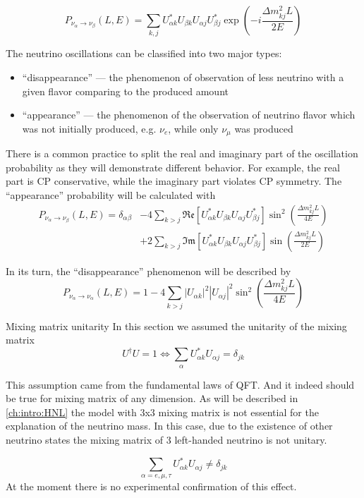 \documentclass[../main.tex]{subfiles}
\begin{document}
\begin{equation}
P_{\nu_\alpha\to\nu_\beta}(L, E)=\sum_{k, j}U^*_{\alpha k}U_{\beta k}U_{\alpha j}U^*_{\beta j}\exp\left(-i\frac{\Delta m^2_{kj}L}{2E}\right)
\end{equation}

The neutrino oscillations can be classified into two major types:
\begin{itemize}
  \item ``disappearance'' --- the phenomenon of observation of less neutrino with a given flavor comparing to the produced amount
  \item ``appearance'' --- the phenomenon of the observation of neutrino flavor which was not initially produced, e.g. $\nu_e$, while  only $\nu_\mu$ was produced
\end{itemize}
There is a common practice to split the real and imaginary part of the oscillation probability as they will demonstrate different behavior. For example, the real part is CP conservative, while the imaginary part violates CP symmetry. The ``appearance'' probability will be calculated with
\begin{align}
\nonumber
P_{\nu_\alpha\to\nu_\beta}(L, E)=\delta_{\alpha\beta}&-4\sum_{k>j}\mathfrak{Re}\left[U^*_{\alpha k}U_{\beta k}U_{\alpha j}U^*_{\beta j}\right]\sin^2\left(\frac{\Delta m^2_{kj}L}{4E}\right) \\
&+2\sum_{k>j}\mathfrak{Im}\left[U^*_{\alpha k}U_{\beta k}U_{\alpha j}U^*_{\beta j}\right]\sin\left(\frac{\Delta m^2_{kj}L}{2E}\right)
\label{eq:intro:app}
\end{align}

In its turn, the ``disappearance'' phenomenon will be described by
\begin{equation}
\label{eq:intro:dis}
P_{\nu_\alpha\to\nu_\alpha}(L, E)=1-4\sum_{k>j}\left|U_{\alpha k}\right|^2\left|U_{\alpha j}\right|^2\sin^2\left(\frac{\Delta m^2_{kj}L}{4E}\right)
\end{equation}

\begin{bclogo}[couleur=blue!2, arrondi=0.1, logo=\bcinfo, nobreak=true]{Mixing matrix unitarity}
In this section we assumed the unitarity of the mixing matrix
\begin{equation}
U^\dag U=1 \Longleftrightarrow\sum_\alpha U^*_{\alpha k}U_{\alpha j}=\delta_{jk}
\end{equation}

This assumption came from the fundamental laws of QFT. And it indeed should be true for mixing matrix of any dimension. As will be described in \autoref{ch:intro:HNL} the model with 3x3 mixing matrix is not essential for the explanation of the neutrino mass. In this case, due to the existence of other neutrino states the mixing matrix of 3 left-handed neutrino is not unitary.

\begin{equation}
\sum_{\alpha=e, \mu, \tau} U^*_{\alpha k}U_{\alpha j}\neq\delta_{jk}
\end{equation}
At the moment there is no experimental confirmation of this effect.
\end{bclogo}
\end{document}
